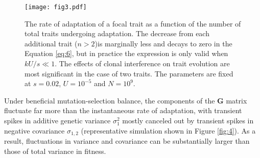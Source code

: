 \documentclass[9pt,twocolumn,twoside]{gsajnl}
\newcommand{\G}{\textbf{G }}
\begin{document}
\begin{figure}[!ht]
\centering
\texttt{[image: fig3.pdf]}
\caption{The rate of adaptation of a focal trait as a function of the number of total traits undergoing adaptation. The decrease from each additional trait ($n>2$)is marginally less and decays to zero in the Equation \eqref{eq:6}, but in practice the expression is only valid when $kU/s \ll 1$. The effects of clonal interference on trait evolution are most significant in the case of two traits. The parameters are fixed at $s=0.02$, $U=10^{-5}$ and $N=10^9$.}
\label{fig:3}
\end{figure}

Under beneficial mutation-selection balance, the components of the \G matrix fluctuate far more than the instantaneous rate of adaptation, with transient spikes in additive genetic variance $\sigma_1^2$ mostly canceled out by transient spikes in negative covariance $\sigma_{1,2}$ (representative simulation shown in Figure \ref{fig:4}). As a result, fluctuations in variance and covariance can be substantially larger than those of total variance in fitness.
\end{document}
